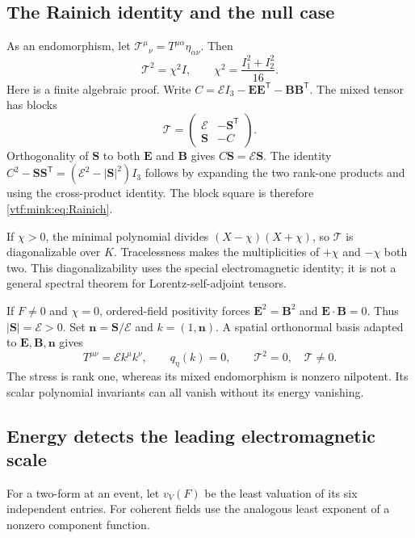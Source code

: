 \documentclass[11pt,letterpaper]{article}
\theoremstyle{definition}
\theoremstyle{remark}
\begin{document}
\subsection{The Rainich identity and the null case}
As an endomorphism, let $\mathcal T^\mu{}_{\nu}=T^{\mu\alpha}\eta_{\alpha\nu}$. Then
\begin{equation}\label{vtf:mink:eq:Rainich}
 \mathcal T^2=\chi^2 I,
 \qquad \chi^2=\frac{I_1^2+I_2^2}{16}.
\end{equation}
Here is a finite algebraic proof. Write $C=\mathcal E I_3-\mathbf E\mathbf E^{\mathsf T}-\mathbf B\mathbf B^{\mathsf T}$. The mixed tensor has blocks
\[
 \mathcal T=\begin{pmatrix}\mathcal E&-\mathbf S^{\mathsf T}\\
 \mathbf S&-C\end{pmatrix}.
\]
Orthogonality of $\mathbf S$ to both $\mathbf E$ and $\mathbf B$ gives $C\mathbf S=\mathcal E\mathbf S$. The identity
$C^2-\mathbf S\mathbf S^{\mathsf T}=(\mathcal E^2-|\mathbf S|^2)I_3$
follows by expanding the two rank-one products and using the cross-product identity. The block square is therefore \cref{vtf:mink:eq:Rainich}.

If $\chi>0$, the minimal polynomial divides $(X-\chi)(X+\chi)$, so $\mathcal T$ is diagonalizable over $K$. Tracelessness makes the multiplicities of $+\chi$ and $-\chi$ both two. This diagonalizability uses the special electromagnetic identity; it is not a general spectral theorem for Lorentz-self-adjoint tensors.

If $F\ne0$ and $\chi=0$, ordered-field positivity forces $\mathbf E^2=\mathbf B^2$ and $\mathbf E\cdot\mathbf B=0$. Thus $|\mathbf S|=\mathcal E>0$. Set $\mathbf n=\mathbf S/\mathcal E$ and $k=(1,\mathbf n)$. A spatial orthonormal basis adapted to $\mathbf E,\mathbf B,\mathbf n$ gives
\begin{equation}\label{vtf:mink:eq:nullstress}
 T^{\mu\nu}=\mathcal E k^\mu k^\nu,
 \qquad q_\eta(k)=0,
 \qquad \mathcal T^2=0,\quad \mathcal T\ne0.
\end{equation}
The stress is rank one, whereas its mixed endomorphism is nonzero nilpotent. Its scalar polynomial invariants can all vanish without its energy vanishing.

\subsection{Energy detects the leading electromagnetic scale}
For a two-form at an event, let $v_V(F)$ be the least valuation of its six independent entries. For coherent fields use the analogous least exponent of a nonzero component function.
\end{document}
